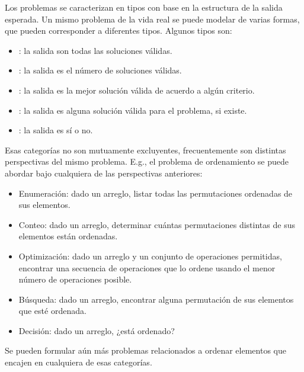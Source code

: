 Los problemas se caracterizan en tipos con base en la estructura de la salida esperada. Un mismo problema de la vida real se puede modelar de varias formas, que pueden corresponder a diferentes tipos. Algunos tipos son:
\begin{itemize}
  \item {}: la salida son todas las soluciones válidas.
  \item {}: la salida es el número de soluciones válidas.
  \item {}: la salida es la mejor solución válida de acuerdo a algún criterio.
  \item {}: la salida es alguna solución válida para el problema, si existe.
  \item {}\label{problema_decision}: la salida es sí o no.
\end{itemize}
Esas categorías no son mutuamente excluyentes, frecuentemente son distintas perspectivas del mismo problema. E.g., el problema de ordenamiento se puede abordar bajo cualquiera de las perspectivas anteriores:
\begin{itemize}
  \item Enumeración: dado un arreglo, listar todas las permutaciones ordenadas de sus elementos.
  \item Conteo: dado un arreglo, determinar cuántas permutaciones distintas de sus elementos están ordenadas.
  \item Optimización: dado un arreglo y un conjunto de operaciones permitidas, encontrar una secuencia de operaciones que lo ordene usando el menor número de operaciones posible.
  \item Búsqueda: dado un arreglo, encontrar alguna permutación de sus elementos que esté ordenada.
  \item Decisión: dado un arreglo, ¿está ordenado?
\end{itemize}
Se pueden formular aún más problemas relacionados a ordenar elementos que encajen en cualquiera de esas categorías. 
